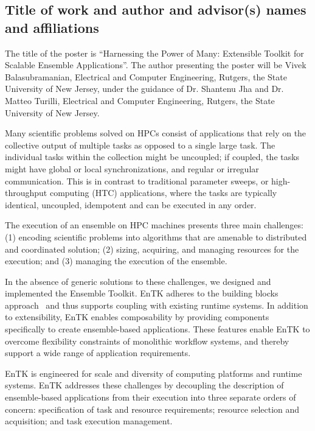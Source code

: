 \subsection{Title of work and author and advisor(s) names and affiliations}

The title of the poster is ``Harnessing the Power of Many: Extensible Toolkit 
for Scalable Ensemble Applications''. The author presenting the poster will be 
Vivek Balasubramanian, Electrical and Computer Engineering, Rutgers, the State 
University of New Jersey, under the guidance of Dr. Shantenu Jha and Dr. Matteo
Turilli, Electrical and Computer Engineering, Rutgers, the State University of 
New Jersey.


Many scientific problems solved on HPCs consist of applications that rely on the
collective output of multiple tasks as opposed to a single large task. The 
individual tasks within the collection might be uncoupled; if coupled, the tasks
might have global or local synchronizations, and regular or irregular 
communication. This is in contrast to traditional parameter sweeps, or 
high-throughput computing (HTC) applications, where the tasks are typically
identical, uncoupled, idempotent and can be executed in any order.

The execution of an ensemble on HPC machines presents three main challenges: 
(1) encoding scientific problems into algorithms that are amenable to 
distributed and coordinated solution; (2) sizing, acquiring, and managing 
resources for the execution; and (3) managing the execution of the ensemble.

In the absence of generic solutions to these challenges, we designed and 
implemented the Ensemble Toolkit. EnTK adheres to the building blocks 
approach~\cite{review_bb_2016} and thus supports coupling with existing runtime 
systems. In addition to extensibility, EnTK enables composability by providing 
components specifically to create ensemble-based applications. These features 
enable EnTK to overcome flexibility constraints of monolithic workflow systems,
and thereby support a wide range of application requirements.

EnTK is engineered for scale and diversity of computing platforms and runtime 
systems. EnTK addresses these challenges by decoupling the description of 
ensemble-based applications from their execution into three separate orders of 
concern: specification of task and resource requirements; resource selection and
acquisition; and task execution management.

